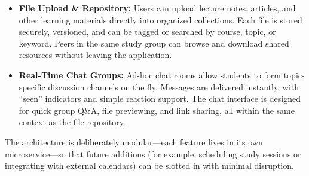\begin{itemize}
  \item \textbf{File Upload \& Repository:}  
    Users can upload lecture notes, articles, and other learning materials directly into organized collections.  Each file is stored securely, versioned, and can be tagged or searched by course, topic, or keyword.  Peers in the same study group can browse and download shared resources without leaving the application.
  
  \item \textbf{Real-Time Chat Groups:}  
    Ad-hoc chat rooms allow students to form topic-specific discussion channels on the fly.  Messages are delivered instantly, with “seen” indicators and simple reaction support.  The chat interface is designed for quick group Q\&A, file previewing, and link sharing, all within the same context as the file repository.
\end{itemize}

The architecture is deliberately modular—each feature lives in its own microservice—so that future additions (for example, scheduling study sessions or integrating with external calendars) can be slotted in with minimal disruption.  
